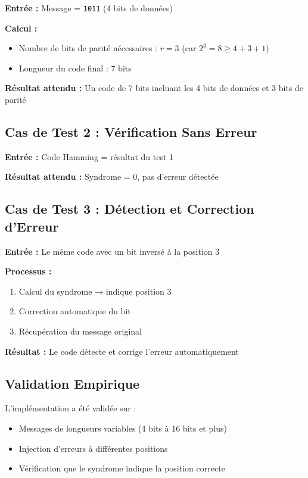 \documentclass[12pt, a4paper]{article}
\begin{document}
\textbf{Entrée :} Message = \texttt{1011} (4 bits de données)

\textbf{Calcul :}
\begin{itemize}
    \item Nombre de bits de parité nécessaires : $r = 3$ (car $2^3 = 8 \geq 4 + 3 + 1$)
    \item Longueur du code final : 7 bits
\end{itemize}

\textbf{Résultat attendu :} Un code de 7 bits incluant les 4 bits de données et 3 bits de parité

\subsection{Cas de Test 2 : Vérification Sans Erreur}

\textbf{Entrée :} Code Hamming = résultat du test 1

\textbf{Résultat attendu :} Syndrome = 0, pas d'erreur détectée

\subsection{Cas de Test 3 : Détection et Correction d'Erreur}

\textbf{Entrée :} Le même code avec un bit inversé à la position 3

\textbf{Processus :}
\begin{enumerate}
    \item Calcul du syndrome → indique position 3
    \item Correction automatique du bit
    \item Récupération du message original
\end{enumerate}

\textbf{Résultat :} Le code détecte et corrige l'erreur automatiquement

\subsection{Validation Empirique}

L'implémentation a été validée sur :
\begin{itemize}
    \item Messages de longueurs variables (4 bits à 16 bits et plus)
    \item Injection d'erreurs à différentes positions
    \item Vérification que le syndrome indique la position correcte
\end{itemize}
\end{document}
